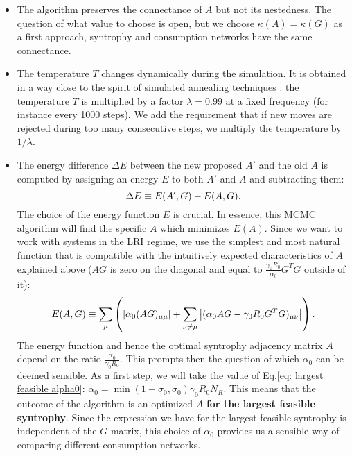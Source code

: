 \documentclass[12pt, titlepage]{report}
\begin{document}
\begin{itemize}
\item The algorithm preserves the connectance of $A$ but not its nestedness. The question of what value to choose is open, but we choose $\kappa(A)=\kappa(G)$ as a first approach, \ie syntrophy and consumption networks have the same connectance.
\item The temperature $T$ changes dynamically during the simulation. It is obtained in a way close to the spirit of simulated annealing techniques \cite{gendreau_simulated_2019}: the temperature $T$ is multiplied by a factor $\lambda=0.99$ at a fixed frequency (for instance every 1000 steps). We add the requirement that if new moves are rejected during too many consecutive steps, we multiply the temperature by $1/\lambda$.
\item The energy difference $\Delta E$ between the new proposed $A'$ and the old $A$ is computed by assigning an energy $E$ to both $A'$ and $A$ and subtracting them:
\begin{equation}
\Delta E \equiv E(A', G)-E(A, G).
\end{equation}
The choice of the energy function $E$ is crucial. In essence, this MCMC algorithm will find the specific $A$ which minimizes $E(A)$. Since we want to work with systems in the LRI regime, we use the simplest and most natural function that is compatible with the intuitively expected characteristics of $A$ explained above (\ie $AG$ is zero on the diagonal and equal to $\frac{\gamma_0 R_0}{\alpha_0} G^TG$ outside of it):
\begin{equation}
E(A,G) \equiv \sum_\mu \left( \left|{\alpha_0(AG)_{\mu\mu}}\right| + \sum_{\nu\neq\mu} \left|{(\alpha_0 AG-\gamma_0 R_0 G^TG)_{\mu\nu} }\right|\right). \label{eq: dynamical stability methods LRI MC solver energy definition}
\end{equation}
The energy function and hence the optimal syntrophy adjacency matrix $A$ depend on the ratio $\frac{\alpha_0}{\gamma_0 R_0}$. This prompts then the question of which $\alpha_0$ can be deemed sensible. As a first step, we will take the value of Eq.\eqref{eq: largest feasible alpha0}: $\alpha_0 = \min(1-\sigma_0, \sigma_0) \gamma_0 R_0 N_R$. This means that the outcome of the algorithm is an optimized $A$ \textbf{for the largest feasible syntrophy}. Since the expression we have for the largest feasible syntrophy is independent of the $G$ matrix, this choice of $\alpha_0$ provides us a sensible way of comparing different consumption networks.
\end{itemize}
\end{document}
